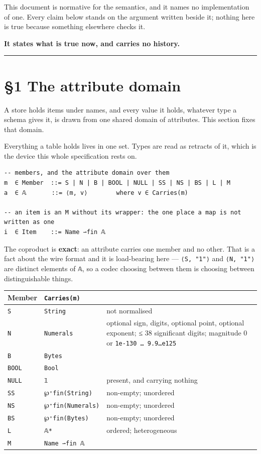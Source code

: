 This document is normative for the semantics, and it names no implementation of one. Every claim
below stands on the argument written beside it; nothing here is true because something elsewhere
checks it.

\textbf{It states what is true now, and carries no history.}

\begin{center}\rule{0.5\linewidth}{0.5pt}\end{center}

\section{§1 The attribute domain}\label{1-the-attribute-domain}

A store holds items under names, and every value it holds, whatever type a schema gives it, is
drawn from one shared domain of attributes. This section fixes that domain.

Everything a table holds lives in one set. Types are read as retracts of it, which is the device
this whole specification rests on.

\begin{verbatim}
-- members, and the attribute domain over them
m  ∈ Member  ::= S | N | B | BOOL | NULL | SS | NS | BS | L | M
a  ∈ 𝔸       ::= ⟨m, v⟩        where v ∈ Carries(m)

-- an item is an M without its wrapper: the one place a map is not written as one
i  ∈ Item    ::= Name ⇀fin 𝔸
\end{verbatim}

The coproduct is \textbf{exact}: an attribute carries one member and no other. That is a fact about the
wire format and it is load-bearing here — \texttt{⟨S,\ "1"⟩} and \texttt{⟨N,\ "1"⟩} are distinct elements of \texttt{𝔸}, so
a codec choosing between them is choosing between distinguishable things.

\begin{tabular}{@{}lll@{}}
\toprule
Member & \texttt{Carries(m)} & \\
\midrule
\texttt{S} & \texttt{String} & not normalised \\
\texttt{N} & \texttt{Numerals} & optional sign, digits, optional point, optional exponent; ≤ 38 significant digits; magnitude 0 or \texttt{1e-130\ …\ 9.9…e125} \\
\texttt{B} & \texttt{Bytes} & \\
\texttt{BOOL} & \texttt{Bool} & \\
\texttt{NULL} & \texttt{𝟙} & present, and carrying nothing \\
\texttt{SS} & \texttt{℘⁺fin(String)} & non-empty; unordered \\
\texttt{NS} & \texttt{℘⁺fin(Numerals)} & non-empty; unordered \\
\texttt{BS} & \texttt{℘⁺fin(Bytes)} & non-empty; unordered \\
\texttt{L} & \texttt{𝔸*} & ordered; heterogeneous \\
\texttt{M} & \texttt{Name\ ⇀fin\ 𝔸} & \\
\bottomrule
\end{tabular}


